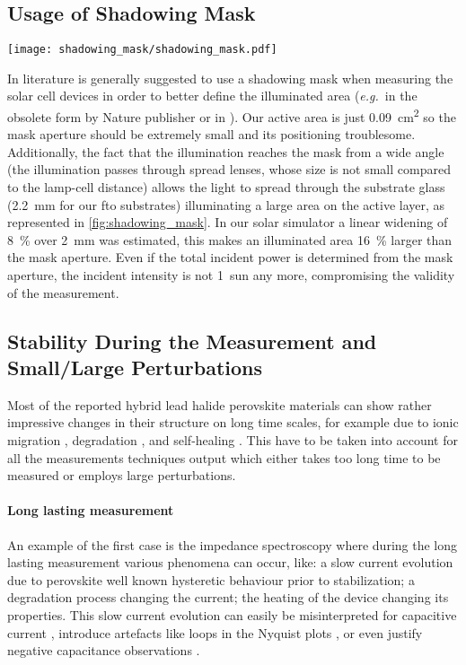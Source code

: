 	\subsection{Usage of Shadowing Mask}

		\begin{SCfigure}
			\centering
			\texttt{[image: shadowing\_mask/shadowing\_mask.pdf]}
			\label{fig:shadowing_mask}
		\end{SCfigure}

		In literature is generally suggested to use a shadowing mask when measuring the solar cell devices in order to better define the illuminated area (\textsl{e.g.}\ in the obsolete \cite{Brinser2017} form by Nature publisher \cite{NatureResearch2017} or in \cite{Christians2015}).
		Our active area is just \SI{0.09}{\square\cm} so the mask aperture should be extremely small and its positioning troublesome.
		Additionally, the fact that the illumination reaches the mask from a wide angle (the illumination passes through spread lenses, whose size is not small compared to the lamp-cell distance) allows the light to spread through the substrate glass (\SI{2.2}{\mm} for our \gls{fto} substrates) illuminating a large area on the active layer, as represented in \cref{fig:shadowing_mask}.
		In our solar simulator a linear widening of 8~\% over \SI{2}{\mm} was estimated, this makes an illuminated area 16~\% larger than the mask aperture.
		Even if the total incident power is determined from the mask aperture, the incident intensity is not 1~sun any more, compromising the validity of the measurement.


	\subsection{Stability During the Measurement and Small\-/Large Perturbations}

		Most of the reported hybrid lead halide perovskite materials can show rather impressive changes in their structure on long time scales, for example due to ionic migration \cite{Calado2016}, degradation \cite{OKane2019}, and self-healing \cite{Ceratti2018}.
		This have to be taken into account for all the measurements techniques output which either takes too long time to be measured or employs large perturbations.

		\paragraph{Long lasting measurement}
		An example of the first case is the impedance spectroscopy where during the long lasting measurement various phenomena can occur, like: a slow current evolution due to perovskite well known hysteretic behaviour prior to stabilization; a degradation process changing the current; the heating of the device changing its properties.
		This slow current evolution can easily be misinterpreted for capacitive current \cite{Jacobs2018}, introduce artefacts like loops in the Nyquist plots \cite{Moia2019}, or even justify negative capacitance observations \cite{Knapp2015}.

